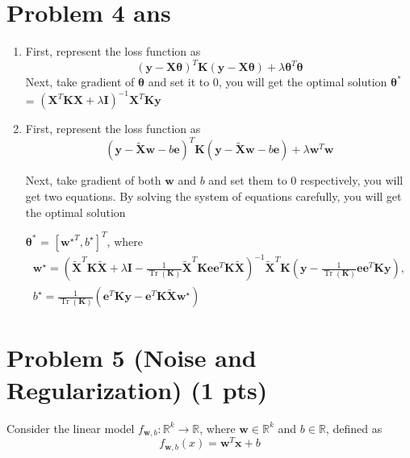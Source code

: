 \documentclass{article}
\DeclareMathOperator{\Tr}{Tr}
\begin{document}
\section*{Problem 4 ans}
\begin{enumerate}[label=(\alph*)]
    \item First, represent the loss function as 
    $$(\boldsymbol{y}-\boldsymbol{X}\boldsymbol{\theta})^T\boldsymbol{K}(\boldsymbol{y}-\boldsymbol{X}\boldsymbol{\theta})+\lambda \boldsymbol{\theta}^T\boldsymbol{\theta}$$
    Next, take gradient of $\boldsymbol{\theta}$ and set it to $0$, you will get the optimal solution $\boldsymbol{\theta^*}$ = $\left( \boldsymbol{X}^T \boldsymbol{K} \boldsymbol{X} + \lambda \boldsymbol{I}\right)^{-1} \boldsymbol{X}^T \boldsymbol{K} \boldsymbol{y}$

    \item First, represent the loss function as
    $$(\boldsymbol{y}-\boldsymbol{\tilde{X}}\boldsymbol{w}-b\boldsymbol{e})^T\boldsymbol{K}(\boldsymbol{y}-\boldsymbol{\tilde{X}}\boldsymbol{w}-b\boldsymbol{e})+\lambda \boldsymbol{w}^T\boldsymbol{w}$$

    Next, take gradient of both $\boldsymbol{w}$ and $b$ and set them to $0$ respectively, you will get two equations. By solving the system of equations carefully, you will get the optimal solution

    $\boldsymbol{\theta^*} $ =  $[ \boldsymbol{w^{\star}}^T, b^{\star}]^T$, where 
\begin{gather*}
\boldsymbol{w^{\star}}=\left( \boldsymbol{\tilde{X}}^T \boldsymbol{K} \boldsymbol{\tilde{X}} + \lambda \boldsymbol{I} - \frac{1}{\Tr{(\boldsymbol{K})}} \boldsymbol{\tilde{X}}^T \boldsymbol{K} \boldsymbol{e} \boldsymbol{e}^T \boldsymbol{K} \boldsymbol{\tilde{X}} \right)^{-1} \boldsymbol{\tilde{X}}^T \boldsymbol{K} \left( \boldsymbol{y} - \frac{1}{\Tr{(\boldsymbol{K})}} \boldsymbol{e} \boldsymbol{e}^T \boldsymbol{K} \boldsymbol{y} \right),\\
b^{\star} = \frac{1}{\Tr{(\boldsymbol{K})}} \left( \boldsymbol{e}^T \boldsymbol{K} \boldsymbol{y} - \boldsymbol{e}^T \boldsymbol{K} \boldsymbol{\tilde{X}} \boldsymbol{w^{\star}} \right)
\end{gather*}
%
    

\end{enumerate}
 

\section*{Problem 5 (Noise and Regularization) (1 pts)}
Consider the linear model $f_{\mathbf{w},b}: \mathbb{R}^k \rightarrow \mathbb{R}$, where $\mathbf{w} \in \mathbb{R}^k$ and $b \in \mathbb{R}$, defined as
$$f_{\mathbf{w},b}(x) = \mathbf{w}^T \mathbf{x} + b$$
\end{document}
